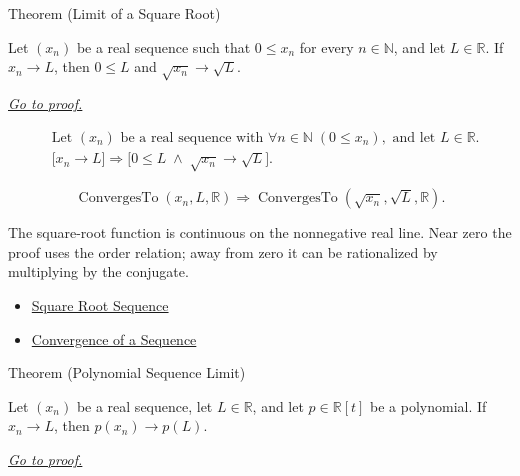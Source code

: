 \begin{theorembox}{Theorem (Limit of a Square Root)}
\begin{theorem}
\label{thm:limit-of-a-square-root}
Let $(x_n)$ be a real sequence such that $0\le x_n$ for every
$n\in\mathbb{N}$, and let $L\in\mathbb{R}$. If $x_n\to L$, then
$0\le L$ and $\sqrt{x_n}\to\sqrt{L}$.

\smallskip
\noindent
\hyperref[prf:limit-of-a-square-root]{\textit{Go to proof.}}
\end{theorem}
\end{theorembox}

\begin{remark*}
\[
\begin{aligned}
&\text{Let } (x_n) \text{ be a real sequence with }
  \forall n\in\mathbb{N}\;(0\le x_n), \text{ and let } L\in\mathbb{R}.\\
&\bigl[x_n\to L\bigr]
\Longrightarrow
\bigl[0\le L \;\land\; \sqrt{x_n}\to\sqrt{L}\bigr].
\end{aligned}
\]
\end{remark*}

\begin{remark*}
\[
\operatorname{ConvergesTo}(x_n,L,\mathbb{R})
\Longrightarrow
\operatorname{ConvergesTo}(\sqrt{x_n},\sqrt{L},\mathbb{R}).
\]
\end{remark*}

\begin{remark*}[Interpretation]
The square-root function is continuous on the nonnegative real line. Near
zero the proof uses the order relation; away from zero it can be rationalized
by multiplying by the conjugate.
\end{remark*}

\begin{dependencies}
\begin{itemize}
  \item \hyperref[def:square-root-sequence]{Square Root Sequence}
  \item \hyperref[def:convergent-sequence]{Convergence of a Sequence}
\end{itemize}
\end{dependencies}


\begin{theorembox}{Theorem (Polynomial Sequence Limit)}
\begin{theorem}
\label{thm:polynomial-sequence-limit}
Let $(x_n)$ be a real sequence, let $L\in\mathbb{R}$, and let
$p\in\mathbb{R}[t]$ be a polynomial. If $x_n\to L$, then
$p(x_n)\to p(L)$.

\smallskip
\noindent
\hyperref[prf:polynomial-sequence-limit]{\textit{Go to proof.}}
\end{theorem}
\end{theorembox}

